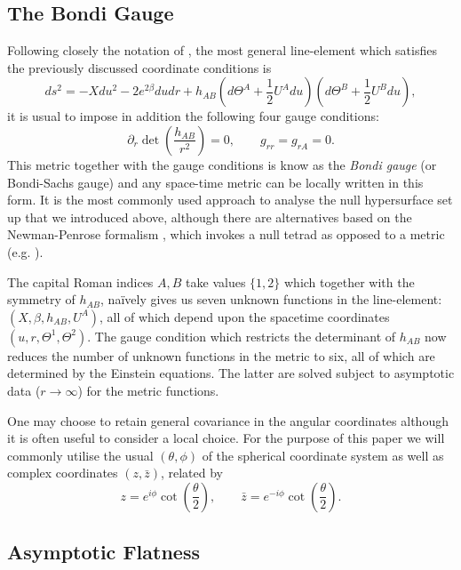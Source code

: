 \documentclass[a4paper,11pt]{article}
\numberwithin{equation}{section}
\begin{document}
\subsection{The Bondi Gauge}
Following closely the notation of \cite{Strominger:2017zoo}, the most general line-element which satisfies the previously discussed coordinate conditions is
\begin{equation}
ds^2=-X du^2 -2e^{2\beta}dudr+ h_{AB}\left(d\Theta^A+\frac{1}{2}U^{A}du\right)\left(d\Theta^B+\frac{1}{2}U^{B}du\right),
\end{equation} 
it is usual to impose in addition the following four gauge conditions:
\begin{equation}
\partial_r \det\left(\frac{h_{AB}}{r^2}\right)=0, \qquad g_{rr}=g_{rA}=0.
\end{equation}
This metric together with the gauge conditions is know as the \textit{Bondi gauge} (or Bondi-Sachs gauge) and any space-time metric can be locally written in this form. It is the most commonly used approach to analyse the null hypersurface set up that we introduced above, although there are alternatives based on the Newman-Penrose formalism \cite{Newman:1961qr}, which invokes a null tetrad as opposed to a metric (e.g. \cite{Barnich:2016lyg}).

The capital Roman indices $A,B$ take values $\{1,2\}$ which together with the symmetry of $h_{AB}$, na\"{i}vely gives us seven unknown functions in the line-element: $(X, \beta, h_{AB}, U^A)$, all of which depend upon the spacetime coordinates $(u, r, \Theta^1, \Theta^2)$. The gauge condition which restricts the determinant of $h_{AB}$ now reduces the number of unknown functions in the metric to six, all of which are determined by the Einstein equations. The latter are solved subject to asymptotic data ($ r \rightarrow \infty$) for the metric functions.  

One may choose to retain general covariance in the angular coordinates \cite{Flanagan:2015pxa} although it is often useful to consider a local choice. For the purpose of this paper we will commonly utilise the usual $(\theta, \phi)$ of the spherical coordinate system as well as complex coordinates  $(z, \bar{z})$, related by
\begin{equation}
z=e^{i\phi}\cot\left(\frac{\theta}{2}\right), \qquad \bar{z}=e^{-i\phi}\cot\left(\frac{\theta}{2}\right).
\end{equation}

\subsection{Asymptotic Flatness}
\end{document}
